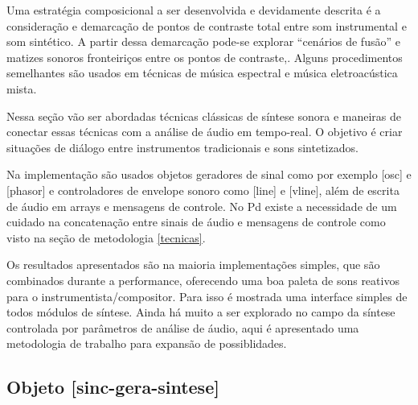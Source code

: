 \documentclass{ppgmus}
\begin{document}
Uma estratégia composicional a ser desenvolvida e devidamente
descrita é a consideração e demarcação de pontos de contraste total
entre som instrumental e som sintético. A partir dessa demarcação pode-se
explorar ``cenários de fusão'' e matizes sonoros fronteiriços entre
os pontos de contraste,. Alguns procedimentos semelhantes são usados
em técnicas de música espectral e música eletroacústica mista.

Nessa seção vão ser abordadas técnicas clássicas de síntese sonora
e maneiras de conectar essas técnicas com a análise
de áudio em tempo-real. O objetivo é criar situações
de diálogo entre instrumentos tradicionais e sons sintetizados.

Na implementação são usados objetos geradores de sinal como
por exemplo [osc\texttildelow] e [phasor\texttildelow] e
controladores de envelope sonoro como [line\texttildelow] e
[vline\texttildelow], além de escrita de áudio em arrays e 
mensagens de controle.
No Pd existe a necessidade de um cuidado na concatenação entre
sinais de áudio e mensagens de controle como visto na seção de metodologia \ref{tecnicas}.




Os resultados apresentados são na maioria implementações simples,
que são combinados durante a performance, oferecendo uma boa paleta
de sons reativos para o instrumentista/compositor. Para isso é
mostrada uma interface simples de todos módulos de síntese.
Ainda há muito a ser explorado no campo da síntese controlada
por parâmetros de análise de áudio, aqui é apresentado uma
metodologia de trabalho para expansão de possiblidades.











% 
% 



\subsection{ Objeto [sinc-gera-sintese]}
\end{document}
